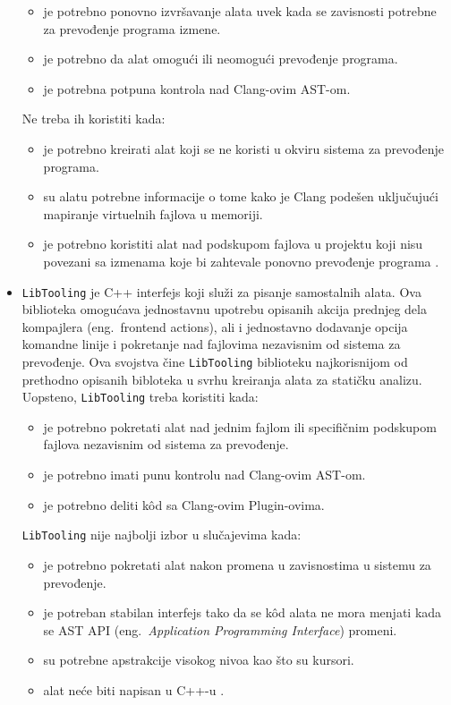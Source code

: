 \documentclass[12pt,oneside]{memoir}
\begin{document}
\begin{itemize}
\begin{itemize}
\item je potrebno ponovno izvr\v{s}avanje alata uvek kada se zavisnosti potrebne za prevođenje programa izmene.
\item je potrebno da alat omogu\'{c}i ili neomogu\'{c}i prevođenje programa.
\item je potrebna potpuna kontrola nad Clang-ovim AST-om.
\end{itemize}
Ne treba ih koristiti kada:
\begin{itemize}
\item je potrebno kreirati alat koji se ne koristi u okviru sistema za prevođenje programa.
\item su alatu potrebne informacije o tome kako je Clang pode\v{s}en uklju\v{c}uju\'{c}i mapiranje virtuelnih fajlova u memoriji.
\item je potrebno koristiti alat nad podskupom fajlova u projektu koji nisu povezani sa izmenama koje bi zahtevale ponovno prevođenje programa \cite{RightInterface}.
\end{itemize}

\item \texttt{LibTooling} je C++ interfejs koji slu\v{z}i za pisanje samostalnih alata. Ova biblioteka omogu\'{c}ava jednostavnu
upotrebu opisanih akcija prednjeg dela kompajlera (eng.~frontend actions), ali i jednostavno dodavanje opcija komandne linije i pokretanje nad fajlovima 
nezavisnim od sistema za prevođenje. Ova svojstva \v{c}ine \texttt{LibTooling} biblioteku najkorisnijom od prethodno opisanih bibloteka u svrhu kreiranja alata za stati\v{c}ku analizu.
Uopsteno, \texttt{LibTooling} treba koristiti kada:
\begin{itemize}
  \item je potrebno pokretati alat nad jednim fajlom ili specifi\v{c}nim podskupom fajlova nezavisnim od sistema za prevođenje.
  \item je potrebno imati punu kontrolu nad Clang-ovim AST-om.
  \item je potrebno deliti k\^{o}d  sa Clang-ovim Plugin-ovima.
\end{itemize}
\texttt{LibTooling} nije najbolji izbor u slu\v{c}ajevima kada:
\begin{itemize}
  \item je potrebno pokretati alat nakon promena u zavisnostima u sistemu za prevođenje.
  \item je potreban stabilan interfejs tako da se k\^{o}d  alata ne mora menjati kada se AST API (eng.~\textit{Application Programming Interface}) promeni.
  \item su potrebne apstrakcije visokog nivoa kao \v{s}to su kursori.
  \item alat ne\'{c}e biti napisan u C++-u \cite{RightInterface}.
\end{itemize}
\end{itemize}
\end{document}
